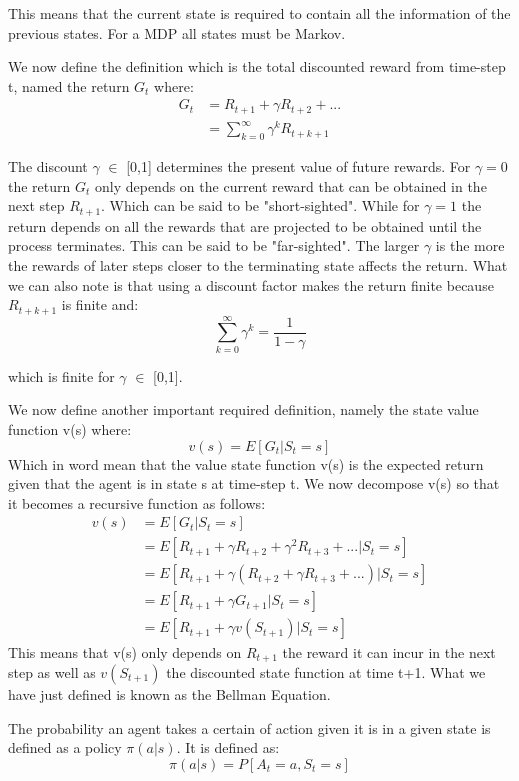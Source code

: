 This means that the current state is required to contain all the information of the previous states. For a MDP all states must be Markov.

We now define the definition which is the total discounted reward from time-step t, named the return $G_t$ where:
\begin{align}
	G_t &= R_{t+1}+\gamma R_{t+2} + ... \\
	&= \sum_{k=0}^{\infty}\gamma^{k} R_{t+k+1}
\end{align}

The discount $\gamma$ $\in$ [0,1] determines the present value of future rewards. For $\gamma=0$ the return $G_t$ only depends on the current reward that can be obtained in the next step $R_{t+1}$. Which can be said to be "short-sighted". While for $\gamma=1$ the return depends on all the rewards that are projected to be obtained until the process terminates. This can be said to be "far-sighted". The larger $\gamma$ is the more the rewards of later steps closer to the terminating state affects the return.\cite{sutton_barto}
What we can also note is that using a discount factor makes the return finite because $R_{t+k+1}$ is finite and:
\[ \sum_{k=0}^{\infty}\gamma^{k}=\frac{1}{1-\gamma}\]
\centerline{which is finite for $\gamma$ $\in$ [0,1].}

We now define another important required definition, namely the state value function v(s) where:
\[v(s) = E[G_t | S_t = s]\]
Which in word mean that the value state function v(s) is the expected return given that the agent is in state s at time-step t.
We now decompose v(s) so that it becomes a recursive function as follows:
\begin{align}
	v(s) &= E[G_t | S_t = s]\\
	&= E[R_{t+1} + \gamma R_{t+2} + \gamma^{2} R_{t+3} + ...|S_t = s]\\
	&= E[R_{t+1} + \gamma (R_{t+2} + \gamma R_{t+3} + ...)|S_t = s]\\
	&= E[R_{t+1} + \gamma G_{t+1}|S_t = s]\\
	&= E[R_{t+1} + \gamma v(S_{t+1})|S_t = s]
	\label{bellmanv1}
\end{align}
This means that v(s) only depends on $R_{t+1}$ the reward it can incur in the next step as well as $v(S_{t+1})$ the discounted state function at time t+1.
What we have just defined is known as the Bellman Equation.\cite{sutton_barto}

The probability an agent takes a certain of action given it is in a given state is defined as a policy $\pi(a|s)$. It is defined as:
\[\pi(a|s) = P[A_t = a, S_t = s]\]


